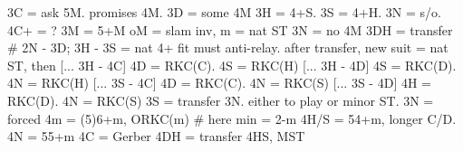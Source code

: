 3C = ask 5M. promises 4M.
    3D = some 4M
        3H = 4+S. 3S = 4+H. 3N = s/o. 4C+ = ?
    3M = 5+M
        oM = slam inv, m = nat ST
    3N = no 4M
3DH = transfer  # 2N - 3D; 3H - 3S = nat
    4+ fit must anti-relay. 
    after transfer, new suit = nat ST, then
        [... 3H - 4C] 4D = RKC(C). 4S = RKC(H)
        [... 3H - 4D] 4S = RKC(D). 4N = RKC(H)
        [... 3S - 4C] 4D = RKC(C). 4N = RKC(S)
        [... 3S - 4D] 4H = RKC(D). 4N = RKC(S)
3S = transfer 3N. either to play or minor ST.
    3N = forced
        4m = (5)6+m, ORKC(m)  # here min = 2-m
        4H/S = 54+m, longer C/D. 4N = 55+m
4C = Gerber
4DH = transfer 4HS, MST